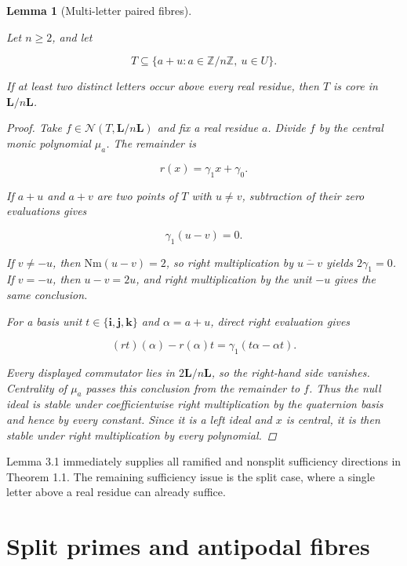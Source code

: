 \documentclass[11pt]{article}
\newtheorem{lemma}[theorem]{Lemma}
\numberwithin{equation}{section}
\begin{document}
\begin{lemma}[Multi-letter paired fibres]
\label{lem:paired-fibres}

Let $n\ge2$, and let

\nopagebreak[4]
\[
T\subseteq\{a+u:a\in\mathbb Z/n\mathbb Z,\ u\in U\}.
\]

If at least two distinct letters occur above every real residue, then $T$ is
core in $\mathbf L/n\mathbf L$.

\begin{proof}

Take $f\in\mathcal N(T,\mathbf L/n\mathbf L)$ and fix a real residue $a$.
Divide $f$ by the central monic polynomial $\mu_a$. The remainder is

\nopagebreak[4]
\[
r(x)=\gamma_1x+\gamma_0.
\]

If $a+u$ and $a+v$ are two points of $T$ with $u\ne v$, subtraction of
their zero evaluations gives

\nopagebreak[4]
\[
\gamma_1(u-v)=0.
\]

If $v\ne-u$, then $\mathrm{Nm}(u-v)=2$, so right multiplication by
$\overline{u-v}$ yields $2\gamma_1=0$. If $v=-u$, then
$u-v=2u$, and right multiplication by the unit $-u$ gives the same
conclusion.

For a basis unit $t\in\{\mathbf i,\mathbf j,\mathbf k\}$ and
$\alpha=a+u$, direct right evaluation gives

\nopagebreak[4]
\[
(rt)(\alpha)-r(\alpha)t
=\gamma_1(t\alpha-\alpha t).
\]

Every displayed commutator lies in $2\mathbf L/n\mathbf L$, so the
right-hand side vanishes. Centrality of $\mu_a$ passes this conclusion from
the remainder to $f$. Thus the null ideal is stable under coefficientwise
right multiplication by the quaternion basis and hence by every constant.
Since it is a left ideal and $x$ is central, it is then stable under right
multiplication by every polynomial.
\end{proof}

\end{lemma}


Lemma 3.1 immediately supplies all ramified and nonsplit sufficiency
directions in Theorem 1.1. The remaining sufficiency issue is the split
case, where a single letter above a real residue can already suffice.

\section{Split primes and antipodal fibres}
\end{document}
